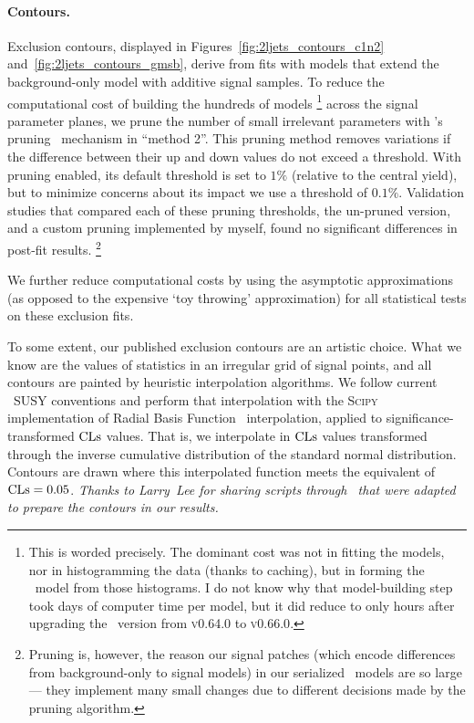 \paragraph{Contours.}
Exclusion contours, displayed in
Figures~\ref{fig:2ljets_contours_c1n2} and~\ref{fig:2ljets_contours_gmsb},
derive from fits with models that extend the background-only model with
additive signal samples.
To reduce the computational cost of building the hundreds of models%
\footnote{%
This is worded precisely. The dominant cost was not in fitting the models, nor
in histogramming the data (thanks to caching), but in forming the
\histfactory\ model from those histograms.
I do not know why that model-building step took days of computer time per
model, but it did reduce to only hours after upgrading the \histfitter\ version
from \textsc{v0.64.0} to \textsc{v0.66.0}.
}
across the signal parameter planes, we prune the number of small irrelevant
parameters with \histfitter's pruning~\cite{histfittergithub} mechanism in
``method 2''.
This pruning method removes variations if the difference between their up and
down values do not exceed a threshold.
With pruning enabled, its default threshold is set to $1\%$ (relative to the
central yield), but to minimize concerns about its impact we use a threshold
of $0.1\%$.
Validation studies that compared each of these pruning thresholds, the
un-pruned version, and a custom pruning implemented by myself, found no
significant differences in post-fit results.%
\footnote{%
Pruning is, however, the reason our signal patches (which encode differences
from background-only to signal models) in our serialized \hepdata\ models are
so large --- they implement many small changes due to different decisions made
by the pruning algorithm.
}

We further reduce computational costs by using the asymptotic approximations
(as opposed to the expensive `toy throwing' approximation) for all statistical
tests on these exclusion fits.

To some extent, our published exclusion contours are an artistic choice.
What we know are the values of statistics in an irregular grid of
signal points,
and all contours are painted by heuristic interpolation algorithms.
We follow current \atlas\ SUSY conventions and perform that interpolation
with the \textsc{Scipy} implementation of
Radial Basis Function~\cite{2020SciPy-NMeth,fasshauer2007meshfree}
interpolation, applied to significance-transformed $\mathrm{CLs}$ values.
That is, we interpolate in $\mathrm{CLs}$ values transformed through the inverse
cumulative distribution of the standard normal distribution.
Contours are drawn where this interpolated function meets the equivalent of
$\mathrm{CLs} = 0.05$.
\emph{%
Thanks to Larry~Lee for sharing scripts through \histfitter\ that were adapted
to prepare the contours in our results.%
}

